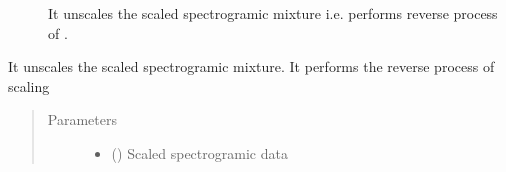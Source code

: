 \documentclass[letterpaper,10pt,english,openany,oneside]{sphinxmanual}
\begin{document}
\begin{fulllineitems}
\begin{fulllineitems}
\begin{sphinxVerbatim}[commandchars=\\\{\}]
  \PYG{p}{[}\PYG{p}{[}    \PYG{p}{]}\PYG{p}{[}    \PYG{p}{]}\PYG{p}{]}
  
\PYG{g+go}{[[0.         0.68273064 0.851306   0.25795466 1.        ]}
\PYG{g+go}{ [0.         0.25795466 0.         0.         0.48812467]]}
\end{sphinxVerbatim}



\begin{description}
\item[{{\hyperref[\detokenize{docs/source/preprocess:preprocess.preprocess_tools.Scaler.unscale}]{}}}] \leavevmode
It unscales the scaled spectrogramic mixture i.e. performs reverse process of .

\end{description}



\end{fulllineitems}


\begin{fulllineitems}
\label{\detokenize{docs/source/preprocess:preprocess.preprocess_tools.Scaler.unscale}}
It unscales the scaled spectrogramic mixture.
It performs the reverse process of scaling
\begin{quote}\begin{description}
\item[{Parameters}] \leavevmode\begin{itemize}
\item {} 
 () \textendash{} Scaled spectrogramic data


\end{itemize}
\end{description}
\end{quote}
\end{fulllineitems}
\end{fulllineitems}
\end{document}
